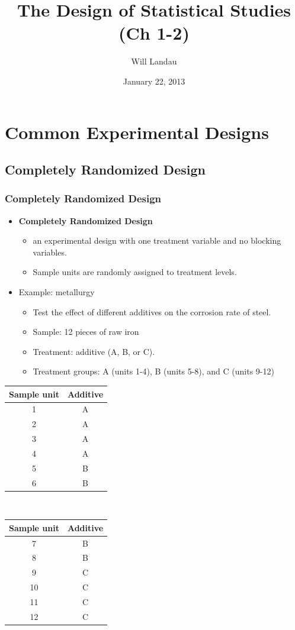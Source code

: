\documentclass[handout]{beamer}\usepackage{graphicx, color}
\title{The Design of Statistical Studies (Ch 1-2)}
\author{Will Landau}
\date{January 22, 2013}
\institute{Iowa State University}
\numberwithin{equation}{section}
\begin{document}
\begin{frame}
\titlepage
 \end{frame}
 

\section{Common Experimental Designs}

\subsection{Completely Randomized Design}


\begin{frame}
\frametitle{Completely Randomized Design} \small

\begin{itemize}
\item {\bf Completely Randomized Design} 
\begin{itemize}
\pause \item an experimental design with one treatment variable and no blocking variables.
\pause \item Sample units are randomly assigned to treatment levels.
\end{itemize} 
\pause \item Example: metallurgy
\begin{itemize}
 \item Test the effect of different additives on the corrosion rate of steel. 
\pause \item Sample: 12 pieces of raw iron
\pause \item Treatment: additive (A, B, or C).
\pause \item Treatment groups: A (units 1-4), B (units 5-8), and C (units 9-12)
\end{itemize} 
\end{itemize}
\scriptsize
\begin{center}
\begin{tabular}{c|c}
Sample unit & Additive \\ \hline
1 & A \\ 
2 & A \\ 
3 & A \\ 
4 & A \\ 
5 & B \\ 
6 & B \\ 
\end{tabular} $\quad$ \begin{tabular}{c|c}
Sample unit & Additive \\ \hline
7 & B \\ 
8 & B \\ 
9 & C \\ 
10 & C \\ 
11 & C \\ 
12 & C \\ 
\end{tabular}
\end{center}
\end{frame}
\end{document}
